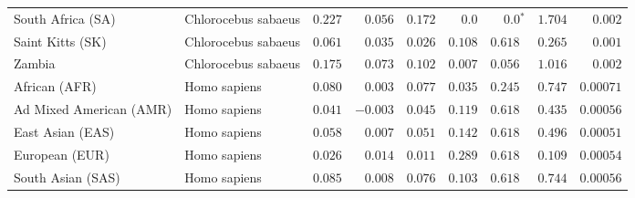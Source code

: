 \begin{center}
\begin{adjustbox}{width = 1\textwidth}
\begin{tabular}{|l|l|r|r|r|r|r|r|r|}
              South Africa (SA) &  Chlorocebus sabaeus &                                        $ 0.227$ &                                           $ 0.056$ &                      $ 0.172$ &            $0.0$ &                  $\bm{0.0{^*}}$ &                                           $ 1.704$ &           $ 0.002$ \\
               Saint Kitts (SK) &  Chlorocebus sabaeus &                                        $ 0.061$ &                                           $ 0.035$ &                      $ 0.026$ &         $ 0.108$ &                      $ 0.618~~$ &                                           $ 0.265$ &           $ 0.001$ \\
                         Zambia &  Chlorocebus sabaeus &                                        $ 0.175$ &                                           $ 0.073$ &                      $ 0.102$ &         $ 0.007$ &                      $ 0.056~~$ &                                           $ 1.016$ &           $ 0.002$ \\
                  African (AFR) &         Homo sapiens &                                        $ 0.080$ &                                           $ 0.003$ &                      $ 0.077$ &         $ 0.035$ &                      $ 0.245~~$ &                                           $ 0.747$ &          $0.00071$ \\
        Ad Mixed American (AMR) &         Homo sapiens &                                        $ 0.041$ &                                           $-0.003$ &                      $ 0.045$ &         $ 0.119$ &                      $ 0.618~~$ &                                           $ 0.435$ &          $0.00056$ \\
               East Asian (EAS) &         Homo sapiens &                                        $ 0.058$ &                                           $ 0.007$ &                      $ 0.051$ &         $ 0.142$ &                      $ 0.618~~$ &                                           $ 0.496$ &          $0.00051$ \\
                 European (EUR) &         Homo sapiens &                                        $ 0.026$ &                                           $ 0.014$ &                      $ 0.011$ &         $ 0.289$ &                      $ 0.618~~$ &                                           $ 0.109$ &          $0.00054$ \\
              South Asian (SAS) &         Homo sapiens &                                        $ 0.085$ &                                           $ 0.008$ &                      $ 0.076$ &         $ 0.103$ &                      $ 0.618~~$ &                                           $ 0.744$ &          $0.00056$ \\

\end{tabular}
\end{adjustbox}
\end{center}
